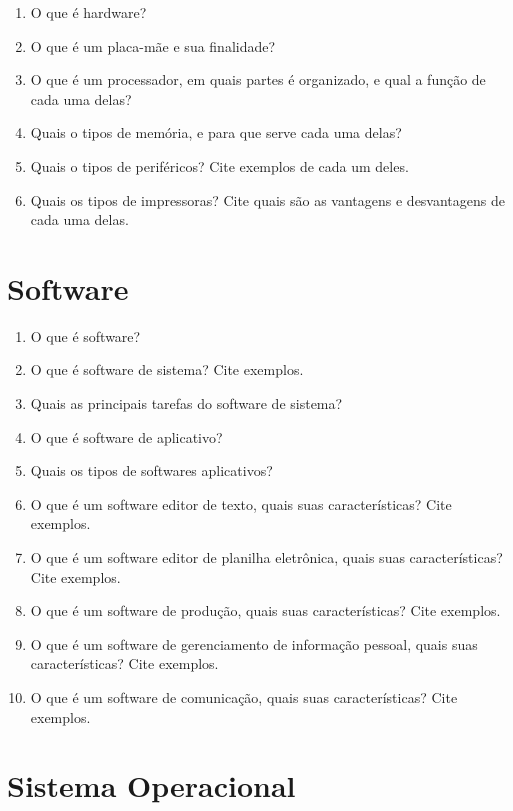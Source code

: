 \documentclass[11pt]{article}
\begin{document}
	\begin{enumerate}
		\item O que é hardware?
		\item O que é um placa-mãe e sua finalidade?
		\item O que é um processador, em quais partes é organizado, e qual a fun\c cão de cada uma delas?
		\item Quais o tipos de memória, e para que serve cada uma delas?
		\item Quais o tipos de periféricos? Cite exemplos de cada um deles.
		\item Quais os tipos de impressoras? Cite quais são as vantagens e desvantagens de cada uma delas.
	\end{enumerate}

	\newpage
	\section{Software}
	
	\begin{enumerate}
		\item O que é software?
		\item O que é software de sistema? Cite exemplos.
		\item Quais as principais tarefas do software de sistema?
		\item O que é software de aplicativo?
		\item Quais os tipos de softwares aplicativos?
		\item O que é um software editor de texto, quais suas características? Cite exemplos.
		\item O que é um software editor de planilha eletrônica, quais suas características? Cite exemplos.
		\item O que é um software de produção, quais suas características? Cite exemplos.
		\item O que é um software de gerenciamento de informação pessoal, quais suas características? Cite exemplos.
		\item O que é um software de comunicação, quais suas características? Cite exemplos.
	\end{enumerate}

	\newpage
	\section{Sistema Operacional}
	
\end{document}
